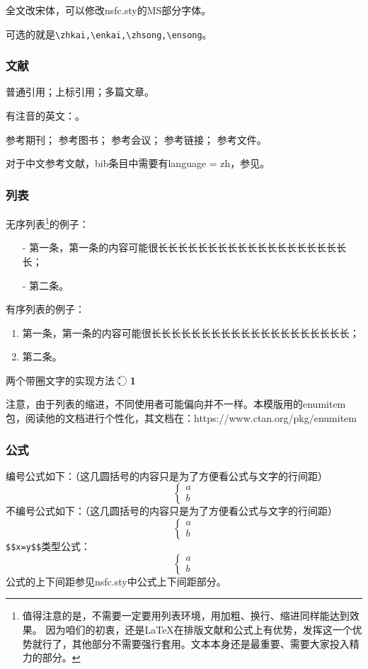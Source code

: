 全文改宋体，可以修改nsfc.sty的MS部分字体。

可选的就是\verb|\zhkai,\enkai,\zhsong,\ensong|。

\subsubsection{文献}
普通引用\cite{test}；上标引用；多篇文章。

有注音的英文：\cite{test}。

参考期刊\cite{test}；
参考图书\cite{test2}；
参考会议\cite{test5}；
参考链接\cite{test4}；
参考文件\cite{test6}。

对于中文参考文献，bib条目中需要有language = {zh}，参见\cite{test2}。
\subsubsection{列表}
无序列表\footnote{值得注意的是，不需要一定要用列表环境，用加粗、换行、缩进同样能达到效果。
	因为咱们的初衷，还是LaTeX在排版文献和公式上有优势，发挥这一个优势就行了，其他部分不需要强行套用。文本本身还是最重要、需要大家投入精力的部分。}的例子：
\begin{itemize}[left= 50pt]
	\item[-] 第一条，第一条的内容可能很长长长长长长长长长长长长长长长长长长长长；
	\item[-] 第二条。
\end{itemize}

有序列表的例子：
\begin{enumerate}[left= 50pt]
	\item 第一条，第一条的内容可能很长长长长长长长长长长长长长长长长长长长长；
	\item 第二条。
\end{enumerate}

两个带圈文字的实现方法：
\textcircled{\raisebox{-0.8pt}{1}}
\textcircled{\textbf{\small 1}}

注意，由于列表的缩进，不同使用者可能偏向并不一样。本模版用的enumitem包，阅读他的文档进行个性化，其文档在：https://www.ctan.org/pkg/enumitem


\subsubsection{公式}

编号公式如下：（这几圆括号的内容只是为了方便看公式与文字的行间距）
\begin{equation}
\begin{cases}
a\\b
\end{cases}
\end{equation}
不编号公式如下：（这几圆括号的内容只是为了方便看公式与文字的行间距）
\begin{equation*}
	\begin{cases}
		a\\b
	\end{cases}
\end{equation*}
\verb|$$x=y$$|类型公式：
$$
	\begin{cases}
		a\\b
	\end{cases}
$$
公式的上下间距参见nsfc.sty中公式上下间距部分。

